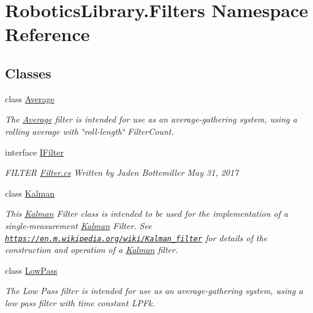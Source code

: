 \hypertarget{namespace_robotics_library_1_1_filters}{}\section{Robotics\+Library.\+Filters Namespace Reference}
\label{namespace_robotics_library_1_1_filters}
\subsection*{Classes}
\begin{DoxyCompactItemize}
\item 
class \hyperlink{class_robotics_library_1_1_filters_1_1_average}{Average}
\begin{DoxyCompactList}\small\item\em The \hyperlink{class_robotics_library_1_1_filters_1_1_average}{Average} filter is intended for use as an average-\/gathering system, using a rolling average with \char`\"{}roll-\/length\char`\"{} {\ttfamily Filter\+Count}.\end{DoxyCompactList}\item 
interface \hyperlink{interface_robotics_library_1_1_filters_1_1_i_filter}{I\+Filter}
\begin{DoxyCompactList}\small\item\em F\+I\+L\+T\+ER \hyperlink{_filter_8cs}{Filter.\+cs} Written by Jaden Bottemiller May 31, 2017 \end{DoxyCompactList}\item 
class \hyperlink{class_robotics_library_1_1_filters_1_1_kalman}{Kalman}
\begin{DoxyCompactList}\small\item\em This \hyperlink{class_robotics_library_1_1_filters_1_1_kalman}{Kalman} Filter class is intended to be used for the implementation of a single-\/measurement \hyperlink{class_robotics_library_1_1_filters_1_1_kalman}{Kalman} Filter. See \href{https://en.m.wikipedia.org/wiki/Kalman_filter}{\tt https\+://en.\+m.\+wikipedia.\+org/wiki/\+Kalman\+\_\+filter} for details of the construction and operation of a \hyperlink{class_robotics_library_1_1_filters_1_1_kalman}{Kalman} filter.\end{DoxyCompactList}\item 
class \hyperlink{class_robotics_library_1_1_filters_1_1_low_pass}{Low\+Pass}
\begin{DoxyCompactList}\small\item\em The Low Pass filter is intended for use as an average-\/gathering system, using a low pass filter with time constant {\ttfamily L\+P\+Fk}.\end{DoxyCompactList}\end{DoxyCompactItemize}
